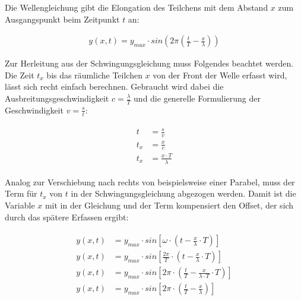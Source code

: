 Die Wellengleichung gibt die Elongation des Teilchens mit dem Abstand $x$ zum Ausgangspunkt beim Zeitpunkt $t$ an:

\begin{align} \label{eq:wellengleichung_y}
	y(x,t) = y_{max} \cdot sin{ (2\pi(\frac{t}{T}-\frac{x}{\lambda})) }
\end{align}

Zur Herleitung aus der Schwingungsgleichung muss Folgendes beachtet werden. Die Zeit $t_x$ bis das räumliche Teilchen $x$ von der Front der Welle erfasst wird, lässt sich recht einfach berechnen. Gebraucht wird dabei die Ausbreitungsgeschwindigkeit $c=\frac{\lambda}{T}$ und die generelle Formulierung der Geschwindigkeit $v=\frac{s}{t}$:

\begin{align}
\begin{split}
	t   &= \frac{s}{v} \\
	t_x &= \frac{x}{c} \\
	t_x &= \frac{x \cdot T}{\lambda}
\end{split}
\end{align}

Analog zur Verschiebung nach rechts von beispielsweise einer Parabel, muss der Term für $t_x$ von $t$ in der Schwingungsgleichung abgezogen werden. Damit ist die Variable $x$ mit in der Gleichung und der Term \glqq kompensiert\grqq{} den \glqq Offset\grqq{}, der sich durch das spätere Erfassen ergibt:

\begin{align}
\begin{split}
	y(x,t) &= y_{max} \cdot sin{[\omega \cdot (t-\frac{x}{\lambda} \cdot T)]} \\
	y(x,t) &= y_{max} \cdot sin{[\frac{2\pi}{T} \cdot (t-\frac{x}{\lambda} \cdot T)]} \\
	y(x,t) &= y_{max} \cdot sin{[2\pi \cdot (\frac{t}{T}-\frac{x}{\lambda \cdot T} \cdot T)]} \\
	y(x,t) &= y_{max} \cdot sin{[2\pi \cdot (\frac{t}{T}-\frac{x}{\lambda})]}
\end{split}
\end{align}
